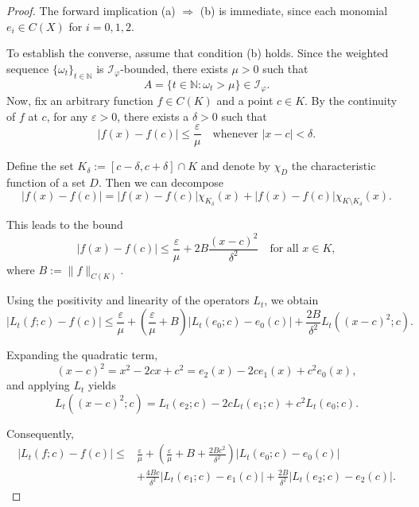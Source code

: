 \documentclass[10pt,a4paper]{amsart}
\begin{document}
	\begin{proof}
		The forward implication (a) $\Rightarrow$ (b) is immediate, since each monomial $e_i \in C(X)$ for $i = 0, 1, 2$.
	

To establish the converse, assume that condition (b) holds. Since the weighted sequence $\{\omega_{t}\}_{t\in\mathbb{N}}$ is $\mathcal{I}_{\varphi}$-bounded, there exists $\mu>0$ such that 
$$
A=\{t\in\mathbb{N}:\omega_t>\mu\}\in\mathcal{I}_{\varphi}.
$$
Now, fix an arbitrary function $f \in C(K)$ and a point $c \in K$. By the continuity of $f$ at $c$, for any $\varepsilon > 0$, there exists a $\delta > 0$ such that
\[
|f(x) - f(c)| \leq \frac{\varepsilon}{\mu} \quad \text{whenever } |x - c| < \delta.
\]

Define the set $K_\delta := [c - \delta, c + \delta] \cap K$ and denote by $\chi_D$ the characteristic function of a set $D$. Then we can decompose
\[
|f(x) - f(c)| = |f(x) - f(c)| \chi_{K_\delta}(x) + |f(x) - f(c)| \chi_{K \setminus K_\delta}(x).
\]

This leads to the bound
\[
|f(x) - f(c)| \leq \frac{\varepsilon}{\mu} + 2B \frac{(x - c)^2}{\delta^2} \quad \text{for all } x \in K,
\]
where $B := \|f\|_{C(K)}$.

Using the positivity and linearity of the operators $L_t$, we obtain
\[
|L_t(f; c) - f(c)| \leq \frac{\varepsilon}{\mu} + (\frac{\varepsilon}{\mu} + B) |L_t(e_0; c) - e_0(c)| + \frac{2B}{\delta^2} L_t\left((x - c)^2; c\right).
\]

Expanding the quadratic term,
\[
(x - c)^2 = x^2 - 2cx + c^2 = e_2(x) - 2c e_1(x) + c^2 e_0(x),
\]
and applying $L_t$ yields
\[
L_t\left((x - c)^2; c\right) = L_t(e_2; c) - 2c L_t(e_1; c) + c^2 L_t(e_0; c).
\]

Consequently,
\begin{align*}
|L_t(f; c) - f(c)| \leq 
&\frac{\varepsilon}{\mu}+ \left(\frac{\varepsilon}{\mu} + B + \frac{2B c^2}{\delta^2} \right) |L_t(e_0; c) - e_0(c)|\\& 
+ \frac{4B c}{\delta^2} |L_t(e_1; c) - e_1(c)| + \frac{2B}{\delta^2} |L_t(e_2; c) - e_2(c)|.
\end{align*}


\end{proof}
\end{document}

